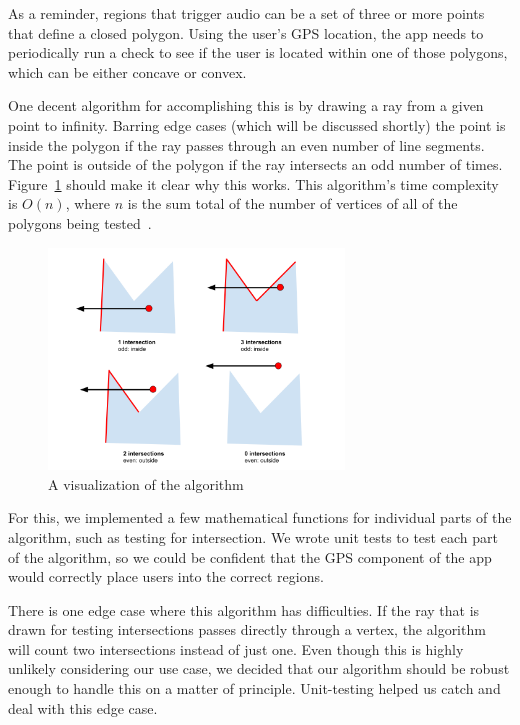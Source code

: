 \documentclass[a4paper, 10pt, american, titlepage]{article}
\begin{document}
As a reminder, regions that trigger audio can be a set of three or more points
that define a closed polygon. Using the user's GPS location, the app needs to
periodically run a check to see if the user is located within one of those
polygons, which can be either concave or convex.

One decent algorithm for accomplishing this is by drawing a ray from a given
point to infinity. Barring edge cases (which will be discussed shortly) the
point is inside the polygon if the ray passes through an even number of line
segments.  The point is outside of the polygon if the ray intersects an odd
number of times. Figure~\ref{fig:intersectionsDiagram} should make it clear why
this works. This algorithm's time complexity is $O(n)$, where $n$ is the sum
total of the number of vertices of all of the polygons being
tested~\autocite{geeksforgeekspolygon}.

\begin{figure}[h]
	\centering
	\includegraphics[width=0.7\textwidth]{intersections-diagram.png}
	\caption{A visualization of the algorithm}
	\label{fig:intersectionsDiagram}
\end{figure}

For this, we implemented a few mathematical functions for individual parts of
the algorithm, such as testing for intersection. We wrote unit tests to test
each part of the algorithm, so we could be confident that the GPS component of
the app would correctly place users into the correct regions.

There is one edge case where this algorithm has difficulties. If the ray that
is drawn for testing intersections passes directly through a vertex, the
algorithm will count two intersections instead of just one. Even though this is
highly unlikely considering our use case, we decided that our algorithm should
be robust enough to handle this on a matter of principle. Unit-testing helped us
catch and deal with this edge case.
\end{document}
